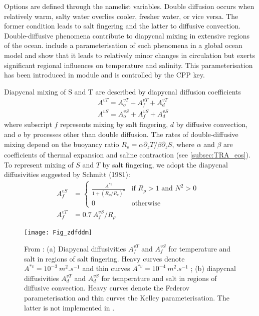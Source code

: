 \documentclass[../tex_main/NEMO_manual]{subfiles}
\begin{document}
Options are defined through the   namelist variables.
Double diffusion occurs when relatively warm, salty water overlies cooler, fresher 
water, or vice versa. The former condition leads to salt fingering and the latter 
to diffusive convection. Double-diffusive phenomena contribute to diapycnal 
mixing in extensive regions of the ocean.  \citet{Merryfield1999} include a 
parameterisation of such phenomena in a global ocean model and show that 
it leads to relatively minor changes in circulation but exerts significant regional 
influences on temperature and salinity. This parameterisation has been 
introduced in  module and is controlled by the  CPP key.

Diapycnal mixing of S and T are described by diapycnal diffusion coefficients 
\begin{align*} %
    &A^{vT} = A_o^{vT}+A_f^{vT}+A_d^{vT}	\\
    &A^{vS} = A_o^{vS}+A_f^{vS}+A_d^{vS}
\end{align*}
where subscript $f$ represents mixing by salt fingering, $d$ by diffusive convection, 
and $o$ by processes other than double diffusion. The rates of double-diffusive 
mixing depend on the buoyancy ratio $R_\rho = \alpha \partial_z T / \beta \partial_z S$, 
where $\alpha$ and $\beta$ are coefficients of thermal expansion and saline 
contraction (see \autoref{subsec:TRA_eos}). To represent mixing of $S$ and $T$ by salt 
fingering, we adopt the diapycnal diffusivities suggested by Schmitt (1981):
\begin{align} \label{eq:zdfddm_f}
A_f^{vS} &= 	\begin{cases}
	\frac{A^{\ast v}}{1+(R_\rho / R_c)^n   } &\text{if  $R_\rho > 1$ and $N^2>0$ } \\
	0 				  					    &\text{otherwise} 
				\end{cases}   
\\ 		    \label{eq:zdfddm_f_T}
A_f^{vT} &= 0.7 \ A_f^{vS} / R_\rho 
\end{align}

\begin{figure}[!t]   \begin{center}
\texttt{[image: Fig\_zdfddm]}
\caption{  \protect\label{fig:zdfddm}
From \citet{Merryfield1999} : (a) Diapycnal diffusivities $A_f^{vT}$ 
and $A_f^{vS}$ for temperature and salt in regions of salt fingering. Heavy 
curves denote $A^{\ast v} = 10^{-3}~m^2.s^{-1}$ and thin curves 
$A^{\ast v} = 10^{-4}~m^2.s^{-1}$ ; (b) diapycnal diffusivities $A_d^{vT}$ and 
$A_d^{vS}$ for temperature and salt in regions of diffusive convection. Heavy 
curves denote the Federov parameterisation and thin curves the Kelley 
parameterisation. The latter is not implemented in \NEMO. }
\end{center}    \end{figure}
\end{document}
